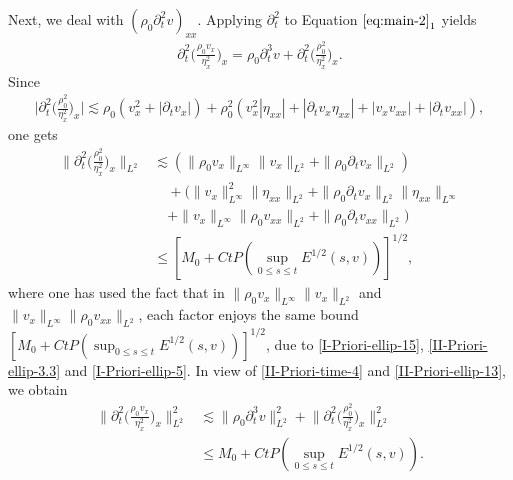 \documentclass[11pt, reqno]{amsart}
\numberwithin{equation}{section}
\begin{document}
{Next, we deal with \((\rho_0\partial_t^2v)_{xx}\).
Applying \(\partial_t^2\) to Equation \(\eqref{eq:main-2}_1\) yields
\begin{equation*}
\begin{aligned}
\partial_t^2\bigg(\frac{\rho_0v_x}{\eta_x^2}\bigg)_{x}=\rho_0\partial_t^3v
+\partial_t^2\bigg(\frac{\rho_0^2}{\eta_x^2}\bigg)_{x}.
\end{aligned}
\end{equation*}
Since
\begin{equation*}
\begin{aligned}
\bigg|\partial_t^2\bigg({\frac{\rho_0^2}{\eta_x^2}}\bigg)_{x}\bigg|
\lesssim \rho_0(v_x^2+|\partial_tv_x|)+\rho_0^2(v_x^2|\eta_{xx}|
+|\partial_tv_x\eta_{xx}|+|v_{x}v_{xx}|+|\partial_tv_{xx}|),
\end{aligned}
\end{equation*}
one gets
\begin{equation}\label{II-Priori-ellip-13}
\begin{aligned}
\bigg\|\partial_t^2\bigg({\frac{\rho_0^2}{\eta_x^2}}\bigg)_{x}\bigg\|_{L^2}
&\lesssim (\|\rho_0v_x\|_{L^\infty}\|v_x\|_{L^2}+\|\rho_0\partial_tv_x\|_{L^2})\\
&\quad+(\|v_x\|_{L^\infty}^2\|\eta_{xx}\|_{L^2}+\|\rho_0\partial_tv_x\|_{L^2}\|\eta_{xx}\|_{L^\infty}\\
&\quad+\|v_x\|_{L^\infty}\|\rho_0v_{xx}\|_{L^2}+\|\rho_0\partial_tv_{xx}\|_{L^2})\\
&\leq [M_0+Ct P(\sup_{0\leq s\leq t}E^{1/2}(s,v))]^{1/2},
\end{aligned}
\end{equation}
where one has used the fact that in \(\|\rho_0v_x\|_{L^\infty}\|v_x\|_{L^2}\) and \(\|v_x\|_{L^\infty}\|\rho_0v_{xx}\|_{L^2}\), each factor enjoys the same bound \([M_0+Ct P(\sup_{0\leq s\leq t}E^{1/2}(s,v))]^{1/2}\), due to \eqref{I-Priori-ellip-15}, \eqref{II-Priori-ellip-3.3} and \eqref{I-Priori-ellip-5}.
In view of \eqref{II-Priori-time-4} and \eqref{II-Priori-ellip-13}, we obtain
\begin{equation}\label{II-Priori-ellip-14}
\begin{aligned}
\bigg\|\partial_t^2\bigg(\frac{\rho_0v_x}{\eta_x^2}\bigg)_{x}\bigg\|_{L^2}^2
&\lesssim \|\rho_0\partial_t^3v\|_{L^2}^2+\bigg\|\partial_t^2\bigg({\frac{\rho_0^2}{\eta_x^2}}\bigg)_{x}\bigg\|_{L^2}^2\\
&\leq M_0+Ct P(\sup_{0\leq s\leq t}E^{1/2}(s,v)).
\end{aligned}
\end{equation}
}
\end{document}
